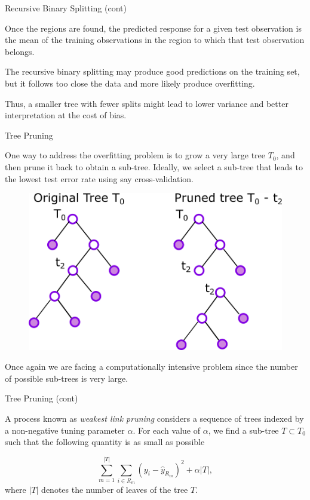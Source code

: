 \documentclass{beamer}
\begin{document}
\begin{frame}{Recursive Binary Splitting (cont)}

Once the regions are found, the predicted response for a given test observation is the mean of the training observations in the region to which that test observation belongs.

The recursive binary splitting may produce good predictions on the training set, but it follows too close the data and more likely produce overfitting. 

Thus, a smaller tree with fewer splits might lead to lower variance and better interpretation at the cost of bias.
\end{frame}

\begin{frame}{Tree Pruning}
	
	
	One way to address the overfitting problem is to grow a very large tree $T_0$, and then prune it back to obtain a sub-tree. Ideally, we select a sub-tree that leads to the lowest test error rate using say cross-validation. 
	\begin{figure}[h]
		\includegraphics{../../Figures/fig_tree_pruning.png}
	\end{figure}
	
	
	Once again we are facing a computationally intensive problem since the number of possible sub-trees is very large.
	
	
\end{frame}

\begin{frame}{Tree Pruning (cont)}
	
	A process known as {\it weakest link pruning} considers a sequence of trees indexed by a non-negative tuning parameter $\alpha$. For each value of $\alpha$, we find a sub-tree $T \subset T_0$ such that the following quantity is as small as possible
	
	\begin{equation}
		\sum_{m=1}^{|T|} \sum_{i\in R_m} (y_i -\hat{y}_{R_m})^2 + \alpha |T|,
	\end{equation}
	 where $|T|$ denotes the number of leaves of the tree $T$.
\end{frame}
\end{document}
